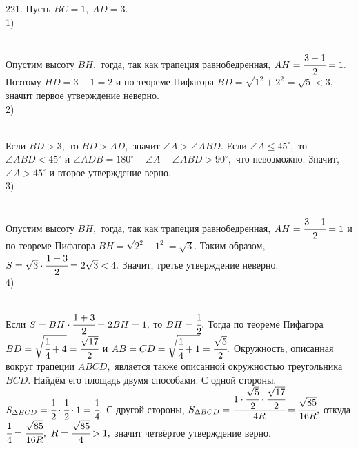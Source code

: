 221. Пусть $BC=1,\ AD=3.$\\
1) \begin{figure}[ht!]
\end{figure}\\
Опустим высоту $BH,$ тогда, так как трапеция равнобедренная, $AH=\cfrac{3-1}{2}=1.$ Поэтому $HD=3-1=2$ и по теореме Пифагора $BD=\sqrt{1^2+2^2}=\sqrt{5}<3,$ значит первое утверждение неверно.\\
2) \begin{figure}[ht!]
\end{figure}\\
Если $BD>3,$ то $BD>AD,$ значит $\angle A>\angle ABD.$ Если $\angle A\leqslant 45^\circ,$ то $\angle ABD<45^\circ$ и $\angle ADB=180^\circ-\angle A-\angle ABD>90^\circ,$ что невозможно. Значит, $\angle A>45^\circ$ и второе утверждение верно.\\
3) \begin{figure}[ht!]
\end{figure}\\
Опустим высоту $BH,$ тогда, так как трапеция равнобедренная, $AH=\cfrac{3-1}{2}=1$ и по теореме Пифагора $BH=\sqrt{2^2-1^2}=\sqrt{3}.$ Таким образом, $S=\sqrt{3}\cdot\cfrac{1+3}{2}=2\sqrt{3}<4.$ Значит, третье утверждение неверно.\\
4) \begin{figure}[ht!]
\end{figure}\\
Если $S=BH\cdot\cfrac{1+3}{2}=2BH=1,$ то $BH=\cfrac{1}{2}.$ Тогда по теореме Пифагора $BD=\sqrt{\cfrac{1}{4}+4}=\cfrac{\sqrt{17}}{2}$ и $AB=CD=\sqrt{\cfrac{1}{4}+1}=\cfrac{\sqrt{5}}{2}.$ Окружность, описанная вокруг трапеции $ABCD,$ является также описанной окружностью треугольника $BCD.$ Найдём его площадь двумя способами. С одной стороны, $S_{\Delta BCD}=\cfrac{1}{2}\cdot\cfrac{1}{2}\cdot1=\cfrac{1}{4}.$ С другой стороны, $S_{\Delta BCD}=\cfrac{1\cdot\cfrac{\sqrt{5}}{2}\cdot\cfrac{\sqrt{17}}{2}}{4R}=\cfrac{\sqrt{85}}{16R},$ откуда $\cfrac{1}{4}=\cfrac{\sqrt{85}}{16R},\ R=\cfrac{\sqrt{85}}{4}>1,$ значит четвёртое утверждение верно.\\
